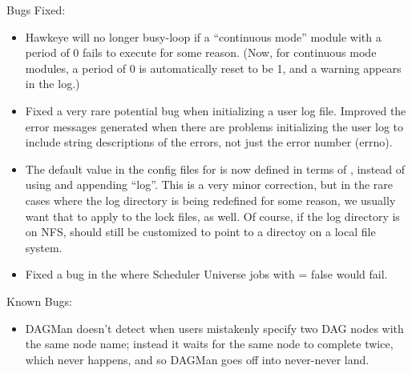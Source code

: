 \noindent Bugs Fixed:
\begin{itemize}

\item Hawkeye will no longer busy-loop if a ``continuous mode''
module with a period of 0 fails to execute for some reason.  (Now, for
continuous mode modules, a period of 0 is automatically reset to be 1, and
a warning appears in the log.)

\item Fixed a very rare potential bug when initializing a user log
file.
Improved the error messages generated when there are problems
initializing the user log to include string descriptions of the
errors, not just the error number (errno).

\item The default value in the config files for  is now
defined in terms of , instead of using 
and appending ``log''.
This is a very minor correction, but in the rare cases where the log
directory is being redefined for some reason, we usually want that to
apply to the lock files, as well.
Of course, if the log directory is on NFS,  should still
be customized to point to a directoy on a local file system.

\item Fixed a bug in the  where Scheduler Universe jobs
  with  = false would fail.

\end{itemize}

\noindent Known Bugs:
\begin{itemize}

\item DAGMan doesn't detect when users mistakenly specify two
DAG nodes with the same node name; instead it waits for the
same node to complete twice, which never happens, and so DAGMan
goes off into never-never land.

\end{itemize}
